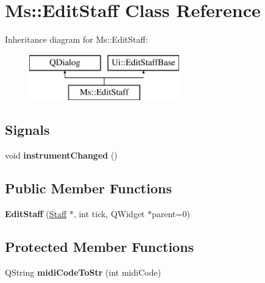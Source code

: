 \hypertarget{class_ms_1_1_edit_staff}{}\section{Ms\+:\+:Edit\+Staff Class Reference}
\label{class_ms_1_1_edit_staff}
Inheritance diagram for Ms\+:\+:Edit\+Staff\+:\begin{figure}[H]
\begin{center}
\leavevmode
\includegraphics[height=2.000000cm]{class_ms_1_1_edit_staff}
\end{center}
\end{figure}
\subsection*{Signals}
\begin{DoxyCompactItemize}
\item 
\mbox{\label{class_ms_1_1_edit_staff_a79feab1e68ce482677c390d922a18808}} 
void {\bfseries instrument\+Changed} ()
\end{DoxyCompactItemize}
\subsection*{Public Member Functions}
\begin{DoxyCompactItemize}
\item 
\mbox{\label{class_ms_1_1_edit_staff_ac2c2e0dd771c010dff8a71b4da1aa0b4}} 
{\bfseries Edit\+Staff} (\hyperlink{class_ms_1_1_staff}{Staff} $\ast$, int tick, Q\+Widget $\ast$parent=0)
\end{DoxyCompactItemize}
\subsection*{Protected Member Functions}
\begin{DoxyCompactItemize}
\item 
\mbox{\label{class_ms_1_1_edit_staff_a60bdbbbf8499f7e972161ba811cb167e}} 
Q\+String {\bfseries midi\+Code\+To\+Str} (int midi\+Code)
\end{DoxyCompactItemize}


